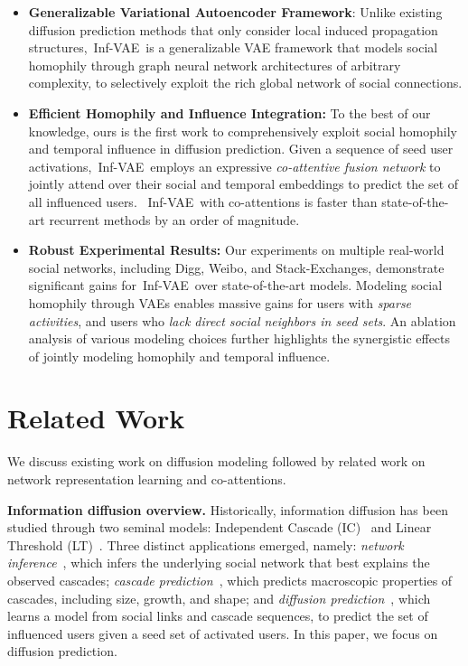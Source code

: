 \documentclass[sigconf]{acmart}
\newcommand{\name}{Inf-VAE}
\begin{document}
\begin{itemize}[leftmargin=*]

\item \textbf{Generalizable Variational Autoencoder Framework}:
Unlike existing diffusion prediction methods that only consider local induced propagation structures,~\name~is a generalizable VAE framework that models social homophily through graph neural network architectures of arbitrary complexity, to selectively exploit the rich global network of social connections.

\item \textbf{Efficient Homophily and Influence Integration:}
To the best of our knowledge,  ours is the first work to comprehensively exploit social homophily and temporal influence in diffusion prediction. Given a sequence of seed user activations,~\name~employs an expressive \textit{co-attentive fusion network} to jointly attend over their social and temporal embeddings to predict the set of all influenced users.
~\name~with co-attentions is faster than state-of-the-art recurrent methods by an order of magnitude.

\item \textbf{Robust Experimental Results:}
Our experiments on multiple real-world social networks, including Digg, Weibo, and Stack-Exchanges, demonstrate significant gains for~\name~over state-of-the-art models.
Modeling social homophily through VAEs enables massive gains for users with \textit{sparse activities}, and users who \textit{lack direct social neighbors in seed sets}. An ablation analysis of
various modeling choices further highlights the synergistic effects of jointly modeling homophily and temporal influence.


















\end{itemize}

\section{Related Work}
\label{sec:related}
We discuss existing work on diffusion modeling followed by
related work on network representation learning and co-attentions.

 
\textbf{Information diffusion overview.}
Historically, information diffusion has been studied through two seminal models: Independent Cascade (IC)~\citep{ic} and Linear Threshold (LT)~\citep{lt}.
Three distinct applications emerged, namely: \textit{network inference}~\cite{netinf}, which infers the underlying social network that best explains the observed cascades; \textit{cascade prediction}~\cite{deepcas}, which predicts macroscopic properties of cascades, including size, growth, and shape; and \textit{diffusion prediction}~\cite{topolstm}, which learns a model from social links and cascade sequences, to predict the set of influenced users given a seed set of activated users.
In this paper, we focus on diffusion prediction.
\end{document}
